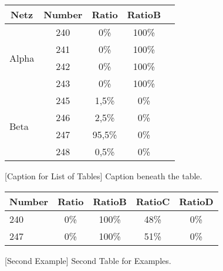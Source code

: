 \vspace{1em}
\begin{table}[H]
	\centering
	\begin{tabular}{l|cccc}
		\toprule
		\multicolumn{1}{c}{\textbf{Netz}} 
		& \multicolumn{1}{c}{\textbf{Number}}
		& \multicolumn{1}{c}{\textbf{Ratio}}
		& \multicolumn{1}{c}{\textbf{RatioB}} \\
		\midrule
		\multirow{4}{*}{Alpha}
		& 240 & 0\% & 100\% \\
		& 241 & 0\% & 100\% \\
		& 242 & 0\% & 100\% \\
		& 243 & 0\% & 100\% \\
		\cmidrule(lr){1-1}
		\cmidrule(lr){2-4}
		\multirow{4}{*}{Beta}
		& 245 & 1,5\% & 0\% \\
		& 246 & 2,5\% & 0\% \\
		& 247 & 95,5\% & 0\% \\
		& 248 & 0,5\% & 0\% \\
		\bottomrule
	\end{tabular} 
	[Caption for List of Tables]
    {Caption beneath the table.}
	\label{tab:example_table}
\end{table}


\vspace{1em}
\begin{table}[H]
	\centering
	\begin{tabular}{l|cccc}
		\toprule
		\multicolumn{1}{c}{\textbf{Number}} 
		& \multicolumn{1}{c}{\textbf{Ratio}}
		& \multicolumn{1}{c}{\textbf{RatioB}} 
		& \multicolumn{1}{c}{\textbf{RatioC}}
		& \multicolumn{1}{c}{\textbf{RatioD}}\\
		\midrule
		240 	& 0\% & 100\% & 48\% & 0\% \\
		247 	& 0\% & 100\% & 51\% & 0\% \\
		\bottomrule
	\end{tabular} 
	[Second Example]
    {Second Table for Examples.}
	\label{tab:vergleich_netz_alpha_vs_beta}
\end{table}
